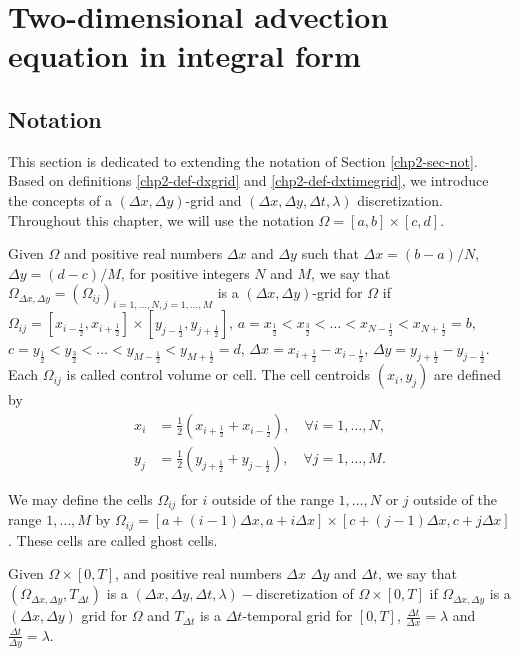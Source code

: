 \section{Two-dimensional advection equation in integral form}
\label{sec-adv2d}

\subsection{Notation}
\label{chp3-sec-not}
This section is dedicated to extending the notation of Section \ref{chp2-sec-not}.
Based on definitions \ref{chp2-def-dxgrid} and \ref{chp2-def-dxtimegrid},
we introduce the concepts of a $(\Delta x,\Delta y)$-grid and $(\Delta x, \Delta y, \Delta t, \lambda)$ discretization.
Throughout this chapter, we will use the notation $\Omega=[a,b]\times[c,d]$.
\begin{definition}
	\label{chp2-def-2dgrid}
	Given $\Omega$ and positive real numbers $\Delta x$ and $\Delta y$ such that $\Delta x = (b-a)/N$, 
	$\Delta y = (d-c)/M$, for positive integers $N$ and $M$,
	we say that $\Omega_{\Delta x, \Delta y}=(\Omega_{ij})_{i=1,\ldots,N,j=1,\ldots,M}$
	is a $(\Delta x, \Delta y)$-grid for $\Omega$ if
	$\Omega_{ij} = [x_{i-\frac{1}{2}}, x_{i+\frac{1}{2}}]\times [y_{j-\frac{1}{2}}, y_{j+\frac{1}{2}}]$, 
	$a = x_{\frac{1}{2}} < x_{\frac{3}{2}} < \ldots < x_{N-\frac{1}{2}} < x_{N+\frac{1}{2}} = b$,
	$c = y_{\frac{1}{2}} < y_{\frac{3}{2}} < \ldots < y_{M-\frac{1}{2}} < y_{M+\frac{1}{2}} = d$,
	$\Delta x = x_{i+\frac{1}{2}}-x_{i-\frac{1}{2}}$, 	$\Delta y = y_{j+\frac{1}{2}}-y_{j-\frac{1}{2}}$.
	Each $\Omega_{ij}$ is called control volume or cell.
	The cell centroids $(x_i,y_j)$ are defined by
    \begin{align*}
       x_i &= \frac{1}{2}(x_{i+\frac{1}{2}} + x_{i-\frac{1}{2}}),\quad \forall i = 1, \ldots, N,\\
       y_j &= \frac{1}{2}(y_{j+\frac{1}{2}} + y_{j-\frac{1}{2}}),\quad \forall j = 1, \ldots, M.
    \end{align*}
\end{definition}
\begin{remark}
	We may define the cells $\Omega_{ij}$ for $i$ outside of the range $1,\ldots, N$ or $j$ outside of the range $1,\ldots, M$  by 
	$\Omega_{ij} = [a+(i-1)\Delta x,a+i\Delta x]\times [c+(j-1)\Delta x,c+j\Delta x]$.
	These cells are called ghost cells.
\end{remark}
\begin{definition}
	\label{chp2-def-dxdytimegrid}
	Given $\Omega \times [0,T]$,
	and positive real numbers $\Delta x$ $\Delta y$ and $\Delta t$, we say that
	$(\Omega_{\Delta x, \Delta y}, {T}_{\Delta t})$
	is a $(\Delta x,\Delta y,\Delta t, \lambda)-$discretization of $\Omega \times [0,T]$ if
	$\Omega_{\Delta x, \Delta y}$ is a $(\Delta x,\Delta y)$
	grid for $\Omega$ and ${T}_{\Delta t}$ is a $\Delta t$-temporal
	grid for $[0,T]$, $\frac{\Delta t}{\Delta x} = \lambda$
	and  $\frac{\Delta t}{\Delta y} = \lambda$.
\end{definition}

